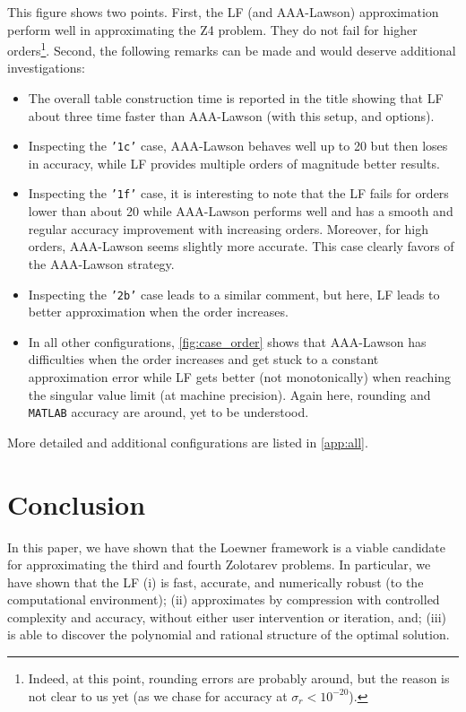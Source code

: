 This figure shows two points. First, the LF (and AAA-Lawson) approximation perform well in approximating the Z4 problem. They do not fail for higher orders\footnote{Indeed, at this point, rounding errors are probably around, but the reason is not clear to us yet (as we chase for accuracy at $\sigma_r<10^{-20}$).}. Second, the following remarks can be made and would deserve additional  investigations: 
\begin{itemize}
    \item The overall table construction time is reported in the title showing that LF about three time faster than AAA-Lawson (with this setup, and options).
    \item Inspecting the \texttt{'1c'} case, AAA-Lawson behaves well up to 20 but then loses in accuracy, while LF provides multiple orders of magnitude better results.
    \item Inspecting the \texttt{'1f'} case, it is interesting to note that the LF fails for orders lower than about 20 while AAA-Lawson performs well and has a smooth and regular accuracy improvement with increasing orders. Moreover, for high orders, AAA-Lawson seems slightly more accurate. This case clearly favors of the AAA-Lawson strategy.
    \item Inspecting the \texttt{'2b'} case leads to a similar comment, but here, LF leads to better approximation when the order increases.
    \item In all other configurations, \cref{fig:case_order} shows that AAA-Lawson has difficulties when the order increases and get stuck to a constant approximation error while LF gets better (not monotonically) when reaching the singular value limit (at machine precision). Again here, rounding and \texttt{MATLAB} accuracy are around, yet to be understood.
\end{itemize}
More detailed and additional configurations are listed in \cref{app:all}.

\section{Conclusion}
\label{sec:conclusion}

In this paper, we have shown that the Loewner framework is a viable candidate for approximating the third and fourth Zolotarev problems. In particular, we have shown that the LF (i) is fast, accurate, and numerically robust (to the computational environment); (ii) approximates by compression with controlled complexity and accuracy, without either user intervention or iteration, and; (iii) is able to discover the polynomial and rational structure of the optimal solution. 

